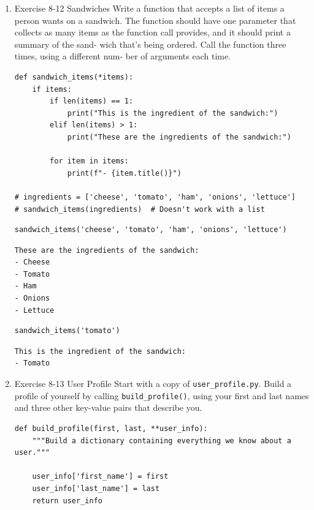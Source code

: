\documentclass[10pt]{book}
\begin{document}
\begin{enumerate}
\item Exercise 8-12 Sandwiches
\label{sec:org3a292df}
Write a function that accepts a list of items a person wants on a sandwich. The function should have one parameter that collects as many items as the function call provides, and it should print a summary of the sand- wich that’s being ordered. Call the function three times, using a different num- ber of arguments each time.
\begin{verbatim}
def sandwich_items(*items):
    if items:
        if len(items) == 1:
            print("This is the ingredient of the sandwich:")
        elif len(items) > 1:
            print("These are the ingredients of the sandwich:")

        for item in items:
            print(f"- {item.title()}")

# ingredients = ['cheese', 'tomato', 'ham', 'onions', 'lettuce']
# sandwich_items(ingredients)  # Doesn't work with a list
\end{verbatim}

\begin{verbatim}
sandwich_items('cheese', 'tomato', 'ham', 'onions', 'lettuce')
\end{verbatim}

\label{org8c61abf}
\begin{verbatim}
These are the ingredients of the sandwich:
- Cheese
- Tomato
- Ham
- Onions
- Lettuce
\end{verbatim}

\begin{verbatim}
sandwich_items('tomato')
\end{verbatim}

\label{org1fa705d}
\begin{verbatim}
This is the ingredient of the sandwich:
- Tomato
\end{verbatim}
\item Exercise 8-13 User Profile
\label{sec:orgc7f7f29}
Start with a copy of \texttt{user\_profile.py}. Build a profile of yourself by calling \texttt{build\_profile()}, using your first and last names and three other key-value pairs that describe you.
\begin{verbatim}
def build_profile(first, last, **user_info):
    """Build a dictionary containing everything we know about a user."""

    user_info['first_name'] = first
    user_info['last_name'] = last
    return user_info



\end{verbatim}
\end{enumerate}
\end{document}

